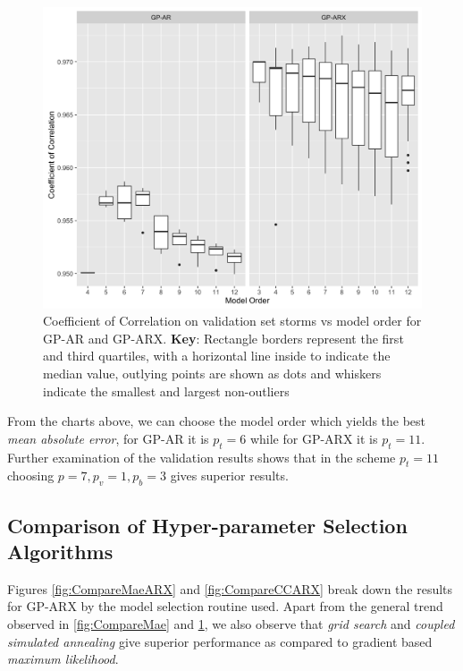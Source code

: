 \documentclass{article}
\begin{document}
\begin{figure}[h]
  \includegraphics[width=\textwidth]{Compare-cc.png}
  \caption{Coefficient of Correlation on validation set storms vs model order for GP-AR and GP-ARX. \textbf{Key}: Rectangle borders represent the first and third quartiles, with a horizontal line inside to indicate the median value, outlying points are shown as dots and whiskers indicate the smallest and largest non-outliers}
  \label{fig:CompareCC}
\end{figure}

From the charts above, we can choose the model order which yields the
best \emph{mean absolute error}, for GP-AR it is $p_t = 6$ while for
GP-ARX it is $p_t = 11$. Further examination of the validation results
shows that in the scheme $p_t = 11$ choosing $p = 7, p_v = 1, p_b = 3$ gives superior results.


\subsection*{Comparison of Hyper-parameter Selection Algorithms}
Figures \ref{fig:CompareMaeARX} and \ref{fig:CompareCCARX} break down
the results for GP-ARX by the model selection routine used. Apart from
the general trend observed in \ref{fig:CompareMae} and
\ref{fig:CompareCC}, we also observe that \emph{grid search} and
\emph{coupled simulated annealing} give superior performance as
compared to gradient based \emph{maximum likelihood}.
\end{document}
